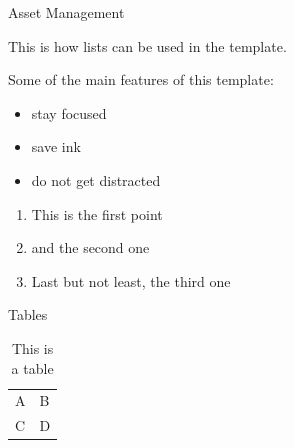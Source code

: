\documentclass[handout]{beamer}
\begin{document}
\begin{frame}{Asset Management}

This is how lists can be used in the template. \\ \vspace{1em}

Some of the main features of this template:
	
	\begin{itemize}
		\item<1-> stay focused
		\item<2-> save ink
		\item<3-> do not get distracted
	\end{itemize}

	\vspace{1em}	

	\begin{enumerate}
		\item<5-> This is the first point
		\item<6-> and the second one
		\item<7-> Last but not least, the third one
	\end{enumerate}
	
\end{frame}



\begin{frame}{Tables}
	\begin{table}
		\begin{tabular}{ll}
			A & B\\
			C & D
		\end{tabular}
		\caption{This is a table}
		\label{tbl:simpletable}
	\end{table}
\end{frame}

\end{document}
